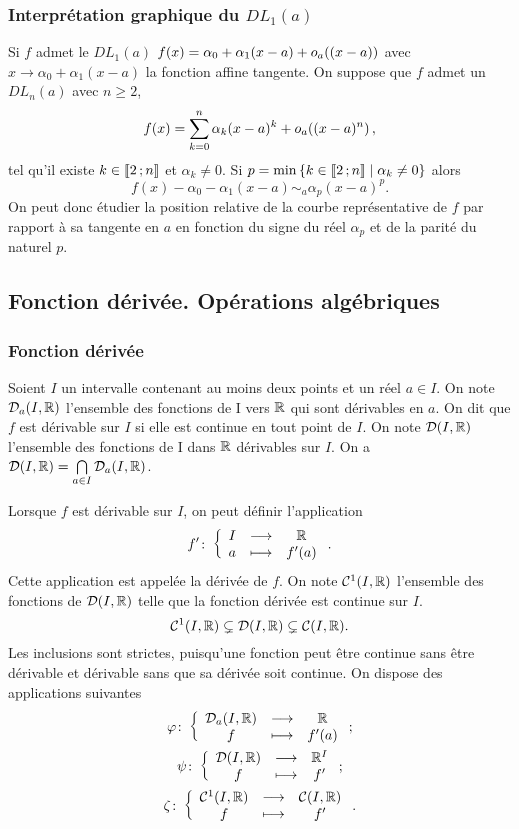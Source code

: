 \subsubsection{Interprétation graphique du \(DL_1(a)\)}

Si \(f\) admet le \(DL_1(a)\) \(f(x)=\alpha_0 +\alpha_1(x-a) +o\mathopen{}_{a}\left((x-a)\right)\) avec \(x \longrightarrow \alpha_0 +\alpha_1(x-a)\) la fonction affine tangente. On suppose que \(f\) admet un \(DL_n(a)\) avec \(n \geqslant 2\),
\begin{equation}
  f(x) = \sum_{k=0}^n \alpha_k (x-a)^k +o\mathopen{}_{a}\left((x-a)^n\right),
\end{equation}
tel qu'il existe \(k \in \mathopen{\llbracket}2\mathclose{}\mathpunct{};n\mathclose{\rrbracket}\) et \(\alpha_k \neq 0\). Si \(p=\min\left\{k \in \mathopen{\llbracket}2\mathclose{}\mathpunct{};n\mathclose{\rrbracket}\mathrel{}\middle|\mathrel{}\alpha_k \neq 0\right\}\) alors
\begin{equation}
  f(x) - \alpha_0 - \alpha_1(x-a) \sim_a \alpha_p (x-a)^p.
\end{equation}
On peut donc étudier la position relative de la courbe représentative de \(f\) par rapport à sa tangente en \(a\) en fonction du signe du réel \(\alpha_p\) et de la parité du naturel \(p\).

\subsection{Fonction dérivée. Opérations algébriques}

\subsubsection{Fonction dérivée}

Soient \(I\) un intervalle contenant au moins deux points et un réel \(a \in I\). On note \(\mathcal{D}_{a}(I,\mathbb{R})\) l'ensemble des fonctions de I vers \(\mathbb{R}\) qui sont dérivables en \(a\). On dit que \(f\) est dérivable sur \(I\) si elle est continue en tout point de \(I\). On note \(\mathcal{D}(I,\mathbb{R})\) l'ensemble des fonctions de I dans \(\mathbb{R}\) dérivables sur \(I\). On a \(\mathcal{D}(I,\mathbb{R})=\bigcap\limits_{a \in I} \mathcal{D}_{a}(I,\mathbb{R})\).

Lorsque \(f\) est dérivable sur \(I\), on peut définir l'application
\begin{equation}
  f'\colon \left\{\begin{array}{ccc} I & \longrightarrow &\mathbb{R}\\ a & \longmapsto & f'(a) \end{array} \right..
\end{equation}
Cette application est appelée la dérivée de \(f\). On note \(\mathcal{C}^{1}(I,\mathbb{R})\) l'ensemble des fonctions de \(\mathcal{D}(I,\mathbb{R})\) telle que la fonction dérivée est continue sur \(I\).
\begin{equation}
  \mathcal{C}^{1}(I,\mathbb{R}) \subsetneq \mathcal{D}(I,\mathbb{R}) \subsetneq \mathcal{C}(I,\mathbb{R}).
\end{equation}
Les inclusions sont strictes, puisqu'une fonction peut être continue sans être dérivable et dérivable sans que sa dérivée soit continue. On dispose des applications suivantes
\begin{gather}
  \varphi\colon \left\{\begin{array}{ccc} \mathcal{D}_{a}(I,\mathbb{R}) & \longrightarrow &\mathbb{R}\\ f & \longmapsto & f'(a) \end{array} \right.; \\ 
  \psi\colon \left\{\begin{array}{ccc} \mathcal{D}(I,\mathbb{R}) & \longrightarrow &\mathbb{R}^I\\ f & \longmapsto & f' \end{array} \right.; \\ 
  \zeta\colon \left\{\begin{array}{ccc} \mathcal{C}^{1}(I,\mathbb{R}) & \longrightarrow &\mathcal{C}(I,\mathbb{R})\\ f & \longmapsto & f' \end{array} \right..
\end{gather}

